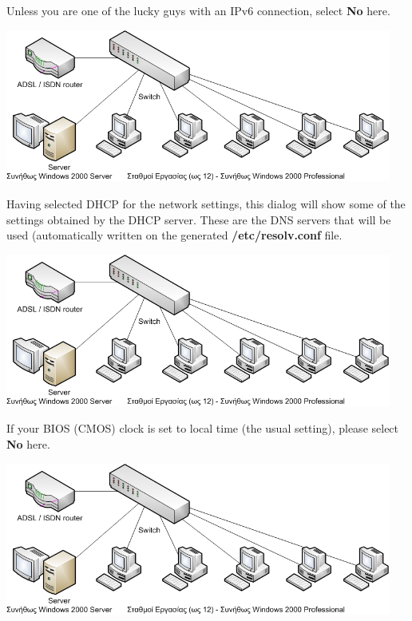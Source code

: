 \documentclass[a4paper,twoside,12pt]{article}
\begin{document}
Unless you are one of the lucky guys with an IPv6 connection, select \textbf{No} here.

\begin{center}
\includegraphics[width=0.95\textwidth]{images/main/school-lab}
\end{center}

Having selected DHCP for the network settings, this dialog will show some of the settings obtained by the DHCP server. These are the DNS servers that will be used (automatically written on the generated \textbf{/etc/resolv.conf} file.

\begin{center}
\includegraphics[width=0.95\textwidth]{images/main/school-lab}
\end{center}

If your BIOS (CMOS) clock is set to local time (the usual setting), please select \textbf{No} here.

\begin{center}
\includegraphics[width=0.95\textwidth]{images/main/school-lab}
\end{center}
\end{document}
